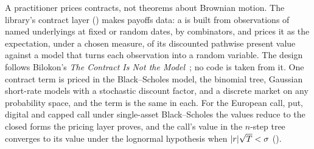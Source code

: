 \documentclass[11pt]{article}
\begin{document}
A practitioner prices contracts, not theorems about Brownian motion. The library's contract layer
() makes payoffs data: a  is built from observations of named underlyings at fixed or
random dates, by combinators, and  prices it as the expectation, under a chosen measure, of its
discounted pathwise present value against a model that turns each observation into a random variable. The design follows
Bilokon's \emph{The Contract Is Not the Model}~\cite{Bilokon2026}; no code is taken from it. One contract term is priced in
the Black--Scholes model, the binomial tree, Gaussian short-rate models with a stochastic discount factor, and a discrete
market on any probability space, and the term is the same in each. For the European call, put, digital and capped call
under single-asset Black--Scholes the values reduce to the closed forms the pricing layer proves, and the call's value in the $n$-step tree converges to its value under the lognormal hypothesis  when
$\lvert r\rvert\sqrt T<\sigma$ ().
\end{document}
